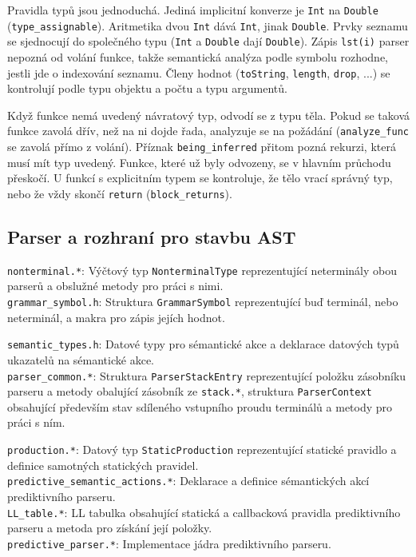 \documentclass[11pt, a4paper]{article}
\begin{document}
Pravidla typů jsou jednoduchá. Jediná implicitní konverze je \texttt{Int} na \texttt{Double} (\texttt{type\_assignable}). Aritmetika dvou \texttt{Int} dává \texttt{Int}, jinak \texttt{Double}. Prvky seznamu se sjednocují do společného typu (\texttt{Int} a \texttt{Double} dají \texttt{Double}). Zápis \texttt{lst(i)} parser nepozná od volání funkce, takže semantická analýza podle symbolu rozhodne, jestli jde o indexování seznamu. Členy hodnot (\texttt{toString}, \texttt{length}, \texttt{drop}, ...) se kontrolují podle typu objektu a počtu a typu argumentů.

Když funkce nemá uvedený návratový typ, odvodí se z typu těla. Pokud se taková funkce zavolá dřív, než na ni dojde řada, analyzuje se na požádání (\texttt{analyze\_func} se zavolá přímo z volání). Příznak \texttt{being\_inferred} přitom pozná rekurzi, která musí mít typ uvedený. Funkce, které už byly odvozeny, se v hlavním průchodu přeskočí. U funkcí s explicitním typem se kontroluje, že tělo vrací správný typ, nebo že vždy skončí \texttt{return} (\texttt{block\_returns}).

\subsection{Parser a rozhraní pro stavbu AST}

\texttt{nonterminal.*}: Výčtový typ \texttt{NonterminalType} reprezentující neterminály obou parserů a obslužné metody pro práci s nimi. \\
\texttt{grammar\_symbol.h}: Struktura \texttt{GrammarSymbol} reprezentující buď terminál, nebo neterminál, a makra pro zápis jejích hodnot.

\texttt{semantic\_types.h}: Datové typy pro sémantické akce a deklarace datových typů ukazatelů na sémantické akce. \\
\texttt{parser\_common.*}: Struktura \texttt{ParserStackEntry} reprezentující položku zásobníku parseru a metody obalující zásobník ze \texttt{stack.*}, struktura \texttt{ParserContext} obsahující především stav sdíleného vstupního proudu terminálů a metody pro práci s ním.

\texttt{production.*}: Datový typ \texttt{StaticProduction} reprezentující statické pravidlo a definice samotných statických pravidel. \\
\texttt{predictive\_semantic\_actions.*}: Deklarace a definice sémantických akcí prediktivního parseru. \\
\texttt{LL\_table.*}: LL tabulka obsahující statická a callbacková pravidla prediktivního parseru a metoda pro získání její položky. \\
\texttt{predictive\_parser.*}: Implementace jádra prediktivního parseru.
\end{document}
